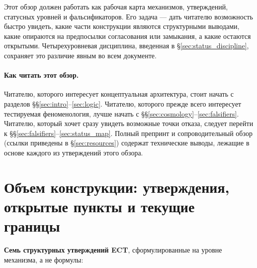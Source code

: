 \documentclass[11pt,a4paper]{article}
\begin{document}
Этот обзор должен работать как рабочая карта механизмов,
утверждений, статусных уровней и фальсификаторов.
Его задача — дать читателю возможность быстро увидеть, какие
части конструкции являются структурными выводами, какие опираются
на предпосылки согласования или замыкания, а какие остаются
открытыми.
Четырехуровневая дисциплина, введенная в
\S\ref{sec:status_discipline}, сохраняет это различие явным во
всем документе.

\paragraph{Как читать этот обзор.}
Читателю, которого интересует концептуальная архитектура, стоит
начать с разделов \S\S\ref{sec:intro}--\ref{sec:logic}.
Читателю, которого прежде всего интересует тестируемая
феноменология, лучше начать с
\S\S\ref{sec:cosmology}--\ref{sec:falsifiers}.
Читателю, который хочет сразу увидеть возможные точки отказа,
следует перейти к \S\S\ref{sec:falsifiers}--\ref{sec:status_map}.
Полный препринт и сопроводительный обзор
(ссылки приведены в \S\ref{sec:resources}) содержат технические
выводы, лежащие в основе каждого из утверждений этого обзора.

\section{Объем конструкции: утверждения, открытые пункты и текущие границы}
\label{sec:scope}

\textbf{Семь структурных утверждений ECT}, сформулированные на
уровне механизма, а не формулы:
\end{document}
